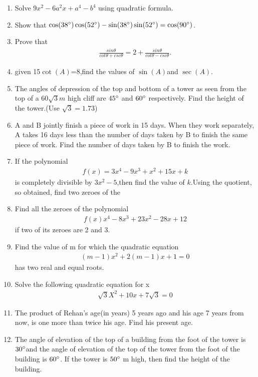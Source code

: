 \documentclass{article}
\begin{document}
\begin{enumerate}
\item Solve $9x^2-6a^2x+a^4-b^4$ using quadratic formula.

\item Show that $\cos(38\degree) \cos(52\degree)-\sin(38\degree)\sin(52\degree)=\cos(90\degree)$.
\item Prove that 
\begin{align}
\frac{sin\theta}{cot\theta+csc\theta}=2+\frac{sin\theta}{cot\theta-csc\theta}.
\end{align}
\item given 15$\cot (A)$=8,find the values of $\sin (A)$and $\sec (A)$.
\item The angles of depression of the top and bottom of a tower as seen from the top of a $60\sqrt{3}m$ high cliff are $45\degree$ and $60\degree$ respectively. Find the height of the tower.(Use $\sqrt{3}=1.73$)
\item A and B jointly finish a piece of work in 15 days. When they work 
separately, A takes 16 days less than the number of days taken by B to 
finish the same piece of work. Find the number of days taken by B to 
finish the work.
\item If the polynomial \begin{align} 
f(x)=3x^4-9x^3+x^2+15x+k
\end{align} is completely divisible by $3x^2-5$,then find the value of $k$.Using the quotient, so obtained, find two zeroes of the 
\item Find all the zeroes of the polynomial \begin{align}
    f(x)x^4-8x^3+23x^2-28x+12
\end{align} if two of its zeroes are 2 and 3.  
    \item Find the value of m for which the quadratic equation
    \begin{align}
                      (m-1)x^2+2(m-1)x+1=0
                  \end{align} has two real and equal roots. 
                  \item Solve the following quadratic equation for x 
                  \begin{align}
                      \sqrt{3}X^2+10x+7\sqrt{3}=0
                  \end{align}
                  \item  The product of Rehan's age(in years) 5 years ago and his age 7 years from now, is one more than twice his age. Find his present age.
                  \item The angle of elevation of the top of a building from the foot of the tower is $30\degree$and the angle of elevation of the top of the tower from the foot of the building is $60\degree$. If the tower is $50\degree$ m high, then find the height of the building.

\end{enumerate}
\end{document}
